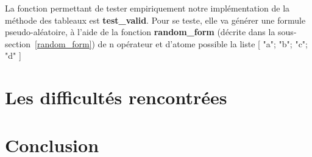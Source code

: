 \documentclass[12pt]{article}
\begin{document}
    La fonction permettant de tester empiriquement notre implémentation de la 
    méthode des tableaux est \textbf{test\_valid}. Pour se teste, elle va 
    générer une formule pseudo-aléatoire, à l'aide de la fonction \textbf{random\_form}
    (décrite dans la sous-section~\ref{random_form}) de n opérateur et d'atome 
    possible la liste [ "a"; "b"; "c"; "d" ]

    \section{Les difficultés rencontrées}
    
    \section{Conclusion}
\end{document}
